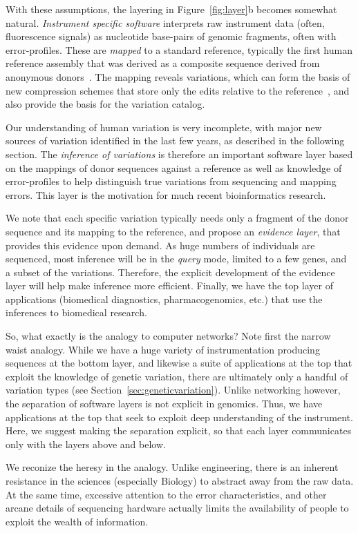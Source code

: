 \documentclass[11pt]{article}
\begin{document}
With these assumptions, the layering in Figure~\ref{fig:layer}b becomes
somewhat natural. \emph{Instrument specific software} interprets raw
instrument data (often, fluorescence signals) as nucleotide base-pairs
of genomic fragments, often with error-profiles. These are
\emph{mapped} to a standard reference, typically the first human
reference assembly that was derived as a composite sequence derived
from anonymous donors~\cite{}. The mapping reveals variations, which
can form the basis of new compression schemes that store only the
edits relative to the reference~\cite{}, and also provide the basis
for the variation catalog.

Our understanding of human variation is very incomplete, with major
new sources of variation identified in the last few years, as
described in the following section. The \emph{inference of variations}
is therefore an important software layer based on the mappings of
donor sequences against a reference as well as knowledge of
error-profiles to help distinguish true variations from sequencing and
mapping errors. This layer is the motivation for much recent
bioinformatics research.

We note that each specific variation typically needs only a fragment
of the donor sequence and its mapping to the reference, and propose an
\emph{evidence layer}, that provides this evidence upon demand. As
huge numbers of individuals are sequenced, most inference will be in
the \emph{query} mode, limited to a few genes, and a subset of the
variations. Therefore, the explicit development of the evidence layer
will help make inference more efficient. Finally, we have the top
layer of applications (biomedical diagnostics, pharmacogenomics, etc.)
that use the inferences to biomedical research.

So, what exactly is the analogy to computer networks? Note first the
narrow waist analogy. While we have a huge variety of instrumentation
producing sequences at the bottom layer, and likewise a suite of
applications at the top that exploit the knowledge of genetic
variation, there are ultimately only a handful of variation types (see
Section~\ref{sec:geneticvariation}). Unlike networking however, the
separation of software layers is not explicit in genomics. Thus, we
have applications at the top that seek to exploit deep understanding
of the instrument.  Here, we suggest making the separation explicit,
so that each layer communicates only with the layers above and below.

We reconize the heresy in the analogy. Unlike engineering, there is an
inherent resistance in the sciences (especially Biology) to abstract
away from the raw data. At the same time, excessive attention to the
error characteristics, and other arcane details of sequencing hardware
actually limits the availability of people to exploit the wealth of
information. 
\end{document}
